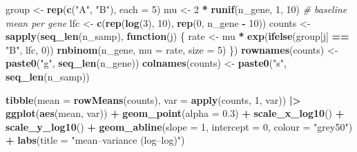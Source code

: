 \documentclass[
]{article}
\newenvironment{Shaded}{\begin{snugshade}}{\end{snugshade}}
\newcommand{\AttributeTok}[1]{\textcolor[rgb]{0.13,0.29,0.53}{#1}}
\newcommand{\CommentTok}[1]{\textcolor[rgb]{0.56,0.35,0.01}{\textit{#1}}}
\newcommand{\ControlFlowTok}[1]{\textcolor[rgb]{0.13,0.29,0.53}{\textbf{#1}}}
\newcommand{\DecValTok}[1]{\textcolor[rgb]{0.00,0.00,0.81}{#1}}
\newcommand{\FloatTok}[1]{\textcolor[rgb]{0.00,0.00,0.81}{#1}}
\newcommand{\FunctionTok}[1]{\textcolor[rgb]{0.13,0.29,0.53}{\textbf{#1}}}
\newcommand{\NormalTok}[1]{#1}
\newcommand{\OtherTok}[1]{\textcolor[rgb]{0.56,0.35,0.01}{#1}}
\newcommand{\SpecialCharTok}[1]{\textcolor[rgb]{0.81,0.36,0.00}{\textbf{#1}}}
\newcommand{\StringTok}[1]{\textcolor[rgb]{0.31,0.60,0.02}{#1}}
\begin{document}
\begin{Shaded}
\begin{Highlighting}[]
\NormalTok{group }\OtherTok{\textless{}{-}} \FunctionTok{rep}\NormalTok{(}\FunctionTok{c}\NormalTok{(}\StringTok{"A"}\NormalTok{, }\StringTok{"B"}\NormalTok{), }\AttributeTok{each =} \DecValTok{5}\NormalTok{)}
\NormalTok{mu }\OtherTok{\textless{}{-}} \DecValTok{2} \SpecialCharTok{*} \FunctionTok{runif}\NormalTok{(n\_gene, }\DecValTok{1}\NormalTok{, }\DecValTok{10}\NormalTok{)   }\CommentTok{\# baseline mean per gene}
\NormalTok{lfc }\OtherTok{\textless{}{-}} \FunctionTok{c}\NormalTok{(}\FunctionTok{rep}\NormalTok{(}\FunctionTok{log}\NormalTok{(}\DecValTok{3}\NormalTok{), }\DecValTok{10}\NormalTok{), }\FunctionTok{rep}\NormalTok{(}\DecValTok{0}\NormalTok{, n\_gene }\SpecialCharTok{{-}} \DecValTok{10}\NormalTok{))}
\NormalTok{counts }\OtherTok{\textless{}{-}} \FunctionTok{sapply}\NormalTok{(}\FunctionTok{seq\_len}\NormalTok{(n\_samp), }\ControlFlowTok{function}\NormalTok{(j) \{}
\NormalTok{  rate }\OtherTok{\textless{}{-}}\NormalTok{ mu }\SpecialCharTok{*} \FunctionTok{exp}\NormalTok{(}\FunctionTok{ifelse}\NormalTok{(group[j] }\SpecialCharTok{==} \StringTok{"B"}\NormalTok{, lfc, }\DecValTok{0}\NormalTok{))}
  \FunctionTok{rnbinom}\NormalTok{(n\_gene, }\AttributeTok{mu =}\NormalTok{ rate, }\AttributeTok{size =} \DecValTok{5}\NormalTok{)}
\NormalTok{\})}
\FunctionTok{rownames}\NormalTok{(counts) }\OtherTok{\textless{}{-}} \FunctionTok{paste0}\NormalTok{(}\StringTok{"g"}\NormalTok{, }\FunctionTok{seq\_len}\NormalTok{(n\_gene))}
\FunctionTok{colnames}\NormalTok{(counts) }\OtherTok{\textless{}{-}} \FunctionTok{paste0}\NormalTok{(}\StringTok{"s"}\NormalTok{, }\FunctionTok{seq\_len}\NormalTok{(n\_samp))}

\FunctionTok{tibble}\NormalTok{(}\AttributeTok{mean =} \FunctionTok{rowMeans}\NormalTok{(counts), }\AttributeTok{var =} \FunctionTok{apply}\NormalTok{(counts, }\DecValTok{1}\NormalTok{, var)) }\SpecialCharTok{|\textgreater{}}
  \FunctionTok{ggplot}\NormalTok{(}\FunctionTok{aes}\NormalTok{(mean, var)) }\SpecialCharTok{+} \FunctionTok{geom\_point}\NormalTok{(}\AttributeTok{alpha =} \FloatTok{0.3}\NormalTok{) }\SpecialCharTok{+}
  \FunctionTok{scale\_x\_log10}\NormalTok{() }\SpecialCharTok{+} \FunctionTok{scale\_y\_log10}\NormalTok{() }\SpecialCharTok{+}
  \FunctionTok{geom\_abline}\NormalTok{(}\AttributeTok{slope =} \DecValTok{1}\NormalTok{, }\AttributeTok{intercept =} \DecValTok{0}\NormalTok{, }\AttributeTok{colour =} \StringTok{"grey50"}\NormalTok{) }\SpecialCharTok{+}
  \FunctionTok{labs}\NormalTok{(}\AttributeTok{title =} \StringTok{"mean–variance (log–log)"}\NormalTok{)}
\end{Highlighting}
\end{Shaded}
\end{document}
